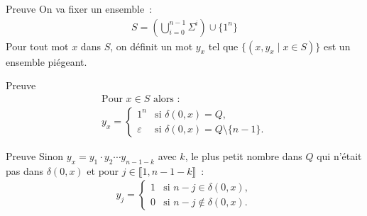 \begin{frame}{\myframetitle}
  \setcounter{enumi}{1}
  \begin{block}{
      Preuve
    }
    On va fixer un ensemble~:
    \begin{gather*}
      S = \left(\bigcup\limits_{i = 0}^{n - 1} \Sigma^i\right) \cup \{1^n\}
    \end{gather*}
    Pour tout mot \(x\) dans \(S\), on définit un mot \(y_x\) tel que
    \(\{(x, y_x \mid x \in S)\}\) est un ensemble piégeant.
  \end{block}
\end{frame}

\begin{frame}{\myframetitle}
  \begin{block}{
      Preuve
    }
    \vspace{-1.5\topsep}
    \begin{gather*}
      \text{Pour } x \in S \text{ alors~:}\\
      y_x =
      \begin{cases}
        1^n &\text{si } \delta(0, x) = Q, \\
        \varepsilon &\text{si } \delta(0, x) = Q \setminus \{n - 1\}.
      \end{cases}
    \end{gather*}
  \end{block}
\end{frame}

\begin{frame}{\myframetitle}
  \begin{block}{
      Preuve
    }
    Sinon \(y_x = y_1 \cdot y_2 \cdots y_{n - 1 - k}\) avec \(k\), le plus petit
    nombre dans \(Q\) qui n'était pas dans \(\delta(0, x)\) et pour \(j \in
    \llbracket 1, n - 1 - k \rrbracket\)~:
    \begin{gather*}
      y_j =
      \begin{cases}
        1 &\text{si } n - j \in \delta(0, x), \\
        0 &\text{si } n - j \notin \delta(0, x).
      \end{cases}
    \end{gather*}
  \end{block}
\end{frame}


